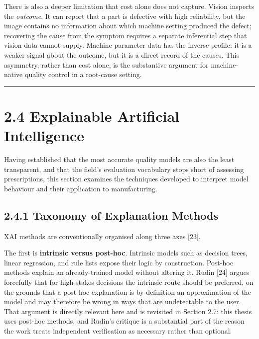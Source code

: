 There is also a deeper limitation that cost alone does not capture. Vision inspects the \emph{outcome}. It can report that a part is defective with high reliability, but the image contains no information about which machine setting produced the defect; recovering the cause from the symptom requires a separate inferential step that vision data cannot supply. Machine-parameter data has the inverse profile: it is a weaker signal about the outcome, but it is a direct record of the causes. This asymmetry, rather than cost alone, is the substantive argument for machine-native quality control in a root-cause setting.

\begin{center}\rule{0.5\linewidth}{0.5pt}\end{center}

\hypertarget{explainable-artificial-intelligence}{%
\section{2.4 Explainable Artificial Intelligence}\label{explainable-artificial-intelligence}}

Having established that the most accurate quality models are also the least transparent, and that the field's evaluation vocabulary stops short of assessing prescriptions, this section examines the techniques developed to interpret model behaviour and their application to manufacturing.

\hypertarget{taxonomy-of-explanation-methods}{%
\subsection{2.4.1 Taxonomy of Explanation Methods}\label{taxonomy-of-explanation-methods}}

XAI methods are conventionally organised along three axes {[}23{]}.

The first is \textbf{intrinsic versus post-hoc}. Intrinsic models such as decision trees, linear regression, and rule lists expose their logic by construction. Post-hoc methods explain an already-trained model without altering it. Rudin {[}24{]} argues forcefully that for high-stakes decisions the intrinsic route should be preferred, on the grounds that a post-hoc explanation is by definition an approximation of the model and may therefore be wrong in ways that are undetectable to the user. That argument is directly relevant here and is revisited in Section 2.7: this thesis uses post-hoc methods, and Rudin's critique is a substantial part of the reason the work treats independent verification as necessary rather than optional.

